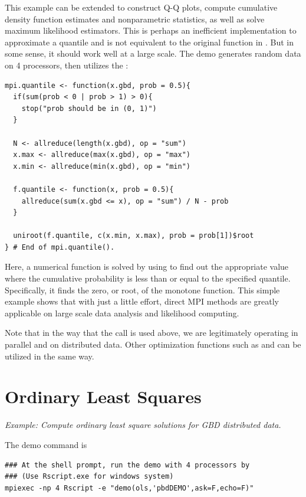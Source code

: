 This example can be extended to construct Q-Q plots, compute cumulative
density function estimates and nonparametric statistics, as well as solve
maximum likelihood estimators. This is perhaps an inefficient implementation
to approximate a quantile and is not equivalent to the original
 function in . But in some sense, it should
work well at a large scale. The demo generates random data on 4
processors, then utilizes the :
\begin{lstlisting}[language=rr,title=R Code]
mpi.quantile <- function(x.gbd, prob = 0.5){
  if(sum(prob < 0 | prob > 1) > 0){
    stop("prob should be in (0, 1)")
  }

  N <- allreduce(length(x.gbd), op = "sum")
  x.max <- allreduce(max(x.gbd), op = "max")
  x.min <- allreduce(min(x.gbd), op = "min")

  f.quantile <- function(x, prob = 0.5){
    allreduce(sum(x.gbd <= x), op = "sum") / N - prob
  }

  uniroot(f.quantile, c(x.min, x.max), prob = prob[1])$root
} # End of mpi.quantile().
\end{lstlisting}
Here, a numerical function is solved by using
 to find out
the appropriate value where the cumulative probability is less than
or equal to the specified quantile. Specifically, it finds the zero, or root,
of the monotone  function. This simple example shows that
with just a little effort, direct MPI methods are greatly applicable on
large scale data analysis and likelihood computing.

Note that in the way that the 
call is used above, we are legitimately operating in parallel and on
distributed data.  Other optimization functions such as
and 
can be utilized in the same way.





\section[Ordinary Least Squares]{Ordinary Least Squares}%
\label{sec:ols}

\emph{Example:  Compute ordinary least square solutions for GBD
      distributed data.}

The demo command is
\begin{lstlisting}
### At the shell prompt, run the demo with 4 processors by
### (Use Rscript.exe for windows system)
mpiexec -np 4 Rscript -e "demo(ols,'pbdDEMO',ask=F,echo=F)"
\end{lstlisting}

